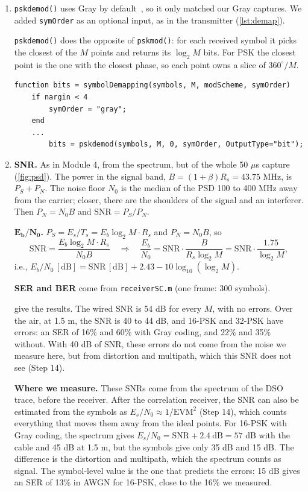 \documentclass[11pt]{article}
\begin{document}
\begin{enumerate}[resume]
    \item \texttt{pskdemod()} uses Gray by default~\cite{pskdemod}, so it only matched our Gray captures. We added \texttt{symOrder} as an optional input, as in the transmitter (\cref{lst:demap}).

    \texttt{pskdemod()} does the opposite of \texttt{pskmod()}: for each received symbol it picks the closest of the $M$ points and returns its $\log_2 M$ bits. For PSK the closest point is the one with the closest phase, so each point owns a slice of $360^\circ/M$.

\begin{lstlisting}[caption={Our changes to \texttt{symbolDemapping.m}.}, label={lst:demap}]
function bits = symbolDemapping(symbols, M, modScheme, symOrder)
    if nargin < 4
        symOrder = "gray";
    end
    ...
        bits = pskdemod(symbols, M, 0, symOrder, OutputType="bit");
\end{lstlisting}

    \item \textbf{SNR.} As in Module 4, from the spectrum, but of the whole 50 $\mu$s capture (\cref{fig:psd}). The power in the signal band, $B = (1+\beta)R_s = 43.75$ MHz, is $P_S + P_N$. The noise floor $N_0$ is the median of the PSD 100 to 400 MHz away from the carrier; closer, there are the shoulders of the signal and an interferer. Then $P_N = N_0 B$ and $\text{SNR} = P_S/P_N$.

    \textbf{$\bm{E_b/N_0}$.} $P_S = E_s/T_s = E_b \log_2 M \cdot R_s$ and $P_N = N_0 B$, so
    \begin{equation}
        \text{SNR} = \frac{E_b \log_2 M \cdot R_s}{N_0 B} \quad \Longrightarrow \quad \frac{E_b}{N_0} = \text{SNR} \cdot \frac{B}{R_s \log_2 M} = \text{SNR} \cdot \frac{1.75}{\log_2 M},
    \end{equation}
    i.e., $E_b/N_0\,[\text{dB}] = \text{SNR}\,[\text{dB}] + 2.43 - 10\log_{10}(\log_2 M)$.

    \textbf{SER and BER} come from \texttt{receiverSC.m} (one frame: 300 symbols).

     give the results. The wired SNR is 54 dB for every $M$, with no errors. Over the air, at 1.5 m, the SNR is 40 to 44 dB, and 16-PSK and 32-PSK have errors: an SER of 16\% and 60\% with Gray coding, and 22\% and 35\% without. With 40 dB of SNR, these errors do not come from the noise we measure here, but from distortion and multipath, which this SNR does not see (Step 14).

    \textbf{Where we measure.} These SNRs come from the spectrum of the DSO trace, before the receiver. After the correlation receiver, the SNR can also be estimated from the symbols as $E_s/N_0 \approx 1/\text{EVM}^2$ (Step 14), which counts everything that moves them away from the ideal points. For 16-PSK with Gray coding, the spectrum gives $E_s/N_0 = \text{SNR} + 2.4~\text{dB} = 57$ dB with the cable and 45 dB at 1.5 m, but the symbols give only 35 dB and 15 dB. The difference is the distortion and multipath, which the spectrum counts as signal. The symbol-level value is the one that predicts the errors: 15 dB gives an SER of 13\% in AWGN for 16-PSK, close to the 16\% we measured.


\end{enumerate}
\end{document}
